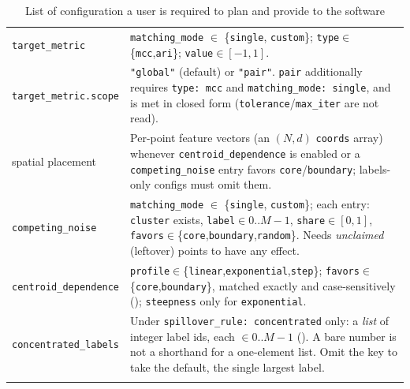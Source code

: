 \documentclass[a4paper,11pt]{article}
\newcommand{\vcode}[1]{\textcolor{valred}{\bfseries\ttfamily #1}}
\begin{document}
\begin{longtable}{@{}L{4.2cm} L{12.0cm}@{}}
\texttt{target\_metric} & \texttt{matching\_mode} $\in$ \{\texttt{single}, \texttt{custom}\}; \texttt{type}$\in$\{\texttt{mcc},\texttt{ari}\}; \texttt{value}$\in[-1,1]$. \\
\texttt{target\_metric.scope} & \texttt{"global"} (default) or \texttt{"pair"}. \texttt{pair} additionally requires \texttt{type: mcc} and \texttt{matching\_mode: single}, and is met in closed form (\texttt{tolerance}/\texttt{max\_iter} are not read). \\
spatial placement & Per-point feature vectors (an $(N,d)$ \texttt{coords} array) whenever \texttt{centroid\_dependence} is enabled or a \texttt{competing\_noise} entry favors \texttt{core}/\texttt{boundary}; labels-only configs must omit them. \\
\texttt{competing\_noise} & \texttt{matching\_mode} $\in$ \{\texttt{single}, \texttt{custom}\}; each entry: \texttt{cluster} exists, \texttt{label}$\in 0..M{-}1$, \texttt{share}$\in[0,1]$, \texttt{favors}$\in$\{\texttt{core},\texttt{boundary},\texttt{random}\}. Needs \emph{unclaimed} (leftover) points to have any effect. \\
\texttt{centroid\_dependence} & \texttt{profile}$\in$\{\texttt{linear},\texttt{exponential},\texttt{step}\}; \texttt{favors}$\in$\{\texttt{core},\texttt{boundary}\}, matched exactly and case-sensitively (\vcode{129}); \texttt{steepness} only for \texttt{exponential}. \\
\texttt{concentrated\_labels} & Under \texttt{spillover\_rule: concentrated} only: a \emph{list} of integer label ids, each $\in 0..M{-}1$ (\vcode{128}). A bare number is not a shorthand for a one-element list. Omit the key to take the default, the single largest label. \\
\bottomrule
\caption{List of configuration a user is required to plan and provide to the software}
\end{longtable}
\newpage
\end{document}
